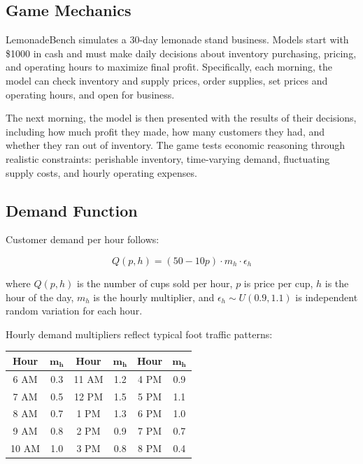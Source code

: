 \documentclass[11pt]{article}
\begin{document}
\subsection{Game Mechanics}

LemonadeBench simulates a 30-day lemonade stand business.
Models start with \$1000 in cash and must make daily decisions about inventory purchasing, pricing, and operating hours to maximize final profit.
Specifically, each morning, the model can check inventory and supply prices, order supplies, set prices and operating hours, and open for business.

The next morning, the model is then presented with the results of their decisions, including how much profit they made, how many customers they had, and whether they ran out of inventory.
The game tests economic reasoning through realistic constraints: perishable inventory, time-varying demand, fluctuating supply costs, and hourly operating expenses.

\subsection{Demand Function}

Customer demand per hour follows:

\begin{equation}
Q(p, h) = (50 - 10p) \cdot m_h \cdot \epsilon_h
\end{equation}

where $Q(p, h)$ is the number of cups sold per hour, $p$ is price per cup, $h$ is the hour of the day, $m_h$ is the hourly multiplier, and $\epsilon_h \sim U(0.9, 1.1)$ is independent random variation for each hour.

Hourly demand multipliers reflect typical foot traffic patterns:

\begin{center}
\begin{tabular}{cc@{\hspace{1cm}}cc@{\hspace{1cm}}cc}
\toprule
\textbf{Hour} & $\mathbf{m_h}$ & \textbf{Hour} & $\mathbf{m_h}$ & \textbf{Hour} & $\mathbf{m_h}$ \\
\midrule
6 AM & 0.3 & 11 AM & 1.2 & 4 PM & 0.9 \\
7 AM & 0.5 & 12 PM & 1.5 & 5 PM & 1.1 \\
8 AM & 0.7 & 1 PM & 1.3 & 6 PM & 1.0 \\
9 AM & 0.8 & 2 PM & 0.9 & 7 PM & 0.7 \\
10 AM & 1.0 & 3 PM & 0.8 & 8 PM & 0.4 \\
\bottomrule
\end{tabular}
\end{center}
    
\end{document}

